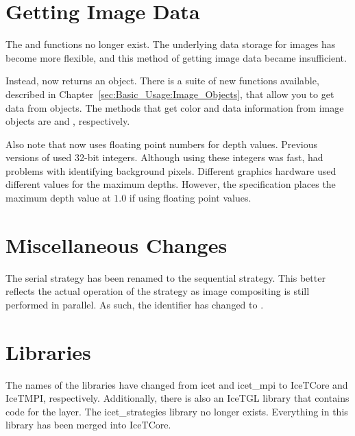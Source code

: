 \section{Getting Image Data}
\label{sec:Transitioning:Getting_Image_Data}

The  and
 functions no longer
exist.  The underlying data storage for images has become more flexible,
and this method of getting image data became insufficient.

Instead,  now returns an  object.
There is a suite of new functions available, described in
Chapter~\ref{sec:Basic_Usage:Image_Objects}, that allow you to get data
from  objects.  The methods that get color and data
information from image objects are \icetImageGetColorub and
\icetImageGetDepthf, respectively.

Also note that \IceT now uses floating point numbers for depth values.
Previous versions of \IceT used 32-bit integers.  Although using these
integers was fast, \IceT had problems with identifying background pixels.
Different graphics hardware used different values for the maximum depths.
However, the \OpenGL specification places the maximum depth value at $1.0$
if using floating point values.

\section{Miscellaneous Changes}
\label{sec:Transitioning:Miscellaneous}

The serial strategy has been renamed to the sequential strategy.  This
better reflects the actual operation of the strategy as image compositing
is still performed in parallel.  As such, the
 identifier has changed to
.

\section{Libraries}
\label{sec:Transitioning:Libraries}

The names of the libraries have changed from icet and
icet\_mpi to IceTCore
and IceTMPI, respectively.  Additionally, there is
also an IceTGL library that contains code for the
\OpenGL layer.  The icet\_strategies
library no longer exists.  Everything in this library has been merged into
IceTCore.

